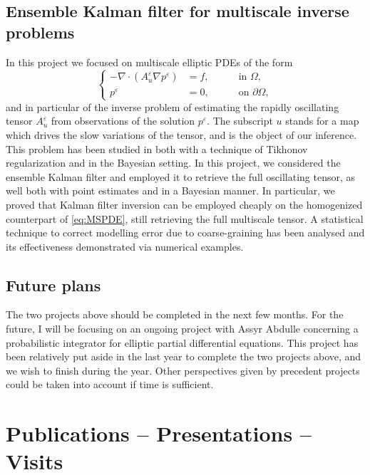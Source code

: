 \documentclass{article}
\theoremstyle{theorem}
\theoremstyle{definition}
\newcommand{\epl}{\varepsilon}
\begin{document}
\subsection{Ensemble Kalman filter for multiscale inverse problems}

In this project we focused on multiscale elliptic PDEs of the form
\begin{equation}\label{eq:MSPDE}
\left\{
\begin{alignedat}{2}
- \nabla \cdot ( A^{\varepsilon}_u \nabla p^{\varepsilon} ) &= f, \quad && \text{ in } \Omega, \\
p^{\varepsilon} &= 0, \quad && \text{ on } \partial \Omega,
\end{alignedat}
\right.
\end{equation}
and in particular of the inverse problem of estimating the rapidly oscillating tensor $A^\epl_u$ from observations of the solution $p^\epl$. The subscript $u$ stands for a map which drives the slow variations of the tensor, and is the object of our inference. This problem has been studied in \cite{AbD18b, AbD19} both with a technique of Tikhonov regularization and in the Bayesian setting. In this project, we considered the ensemble Kalman filter and employed it to retrieve the full oscillating tensor, as well both with point estimates and in a Bayesian manner. In particular, we proved that Kalman filter inversion can be employed cheaply on the homogenized counterpart of \eqref{eq:MSPDE}, still retrieving the full multiscale tensor. A statistical technique to correct modelling error due to coarse-graining has been analysed and its effectiveness demonstrated via numerical examples.

\subsection{Future plans}

The two projects above should be completed in the next few months. For the future, I will be focusing on an ongoing project with Assyr Abdulle concerning a probabilistic integrator for elliptic partial differential equations. This project has been relatively put aside in the last year to complete the two projects above, and we wish to finish during the year. Other perspectives given by precedent projects could be taken into account if time is sufficient.
			
\section{Publications -- Presentations -- Visits}
\end{document}
